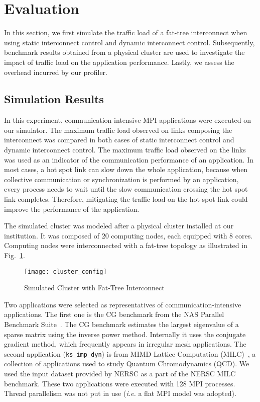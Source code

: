 \section{Evaluation}\label{ii-evaluation}

In this section, we first simulate the traffic load of a fat-tree
interconnect when using static interconnect control and dynamic
interconnect control. Subsequently, benchmark results obtained from a
physical cluster are used to investigate the impact of traffic load on
the application performance. Lastly, we assess the overhead incurred by
our profiler.

\subsection{Simulation Results}\label{ii-simulation-results}

In this experiment, communication-intensive MPI applications were
executed on our simulator. The maximum traffic load observed on links
composing the interconnect was compared in both cases of static
interconnect control and dynamic interconnect control. The maximum
traffic load observed on the links was used as an indicator of the
communication performance of an application. In most cases, a hot spot
link can slow down the whole application, because when collective
communication or synchronization is performed by an application, every
process needs to wait until the slow communication crossing the hot spot
link completes. Therefore, mitigating the traffic load on the hot spot
link could improve the performance of the application.

The simulated cluster was modeled after a physical cluster installed at
our institution. It was composed of 20 computing nodes, each equipped
with 8 cores. Computing nodes were interconnected with a fat-tree
topology as illustrated in Fig.~\ref{fig:cluster-config}.

\begin{figure}
    \centering
    \texttt{[image: cluster\_config]}
    \caption{Simulated Cluster with Fat-Tree Interconnect}%
    \label{fig:cluster-config}
\end{figure}

Two applications were selected as representatives of
communication-intensive applications. The first one is the CG benchmark
from the NAS Parallel Benchmark Suite~\autocite{Bailey1991}. The CG
benchmark estimates the largest eigenvalue of a sparse matrix using the
inverse power method. Internally it uses the conjugate gradient method,
which frequently appears in irregular mesh applications. The second
application (\lstinline!ks_imp_dyn!) is from MIMD
Lattice Computation (MILC)~\autocite{milc}, a collection of applications
used to study Quantum Chromodynamics (QCD). We used the input dataset
provided by NERSC as a part of the NERSC MILC benchmark. These two
applications were executed with 128 MPI processes. Thread parallelism
was not put in use (\emph{i.e.} a flat MPI model was adopted).

